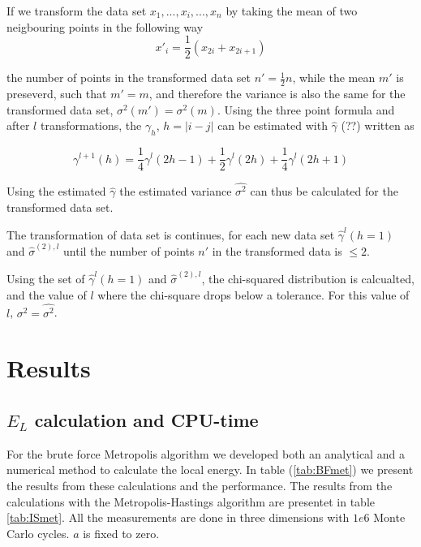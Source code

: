 \documentclass[norsk,a4paper,12pt]{article}
\begin{document}
If we transform the data set ${x_1, ...,x_i,..., x_n}$ by taking the mean of two neigbouring points in the following way
\begin{equation}
	x'_i = \frac{1}{2}(x_{2i} + x_{2i+1})
\end{equation}

 the number of points in the transformed data set $n' = \frac{1}{2} n$, while the mean $m'$ is preseverd, such that $m' = m$, and therefore the variance is also the same for the transformed data set, $\sigma^2(m') = \sigma^2(m)$. Using the three point formula and after $l$ transformations, the $\gamma_h$, $h= |i-j|$ can be estimated with $\hat{\gamma}$ (??) written as 
 
 \begin{equation}
 	\gamma^{l+1}(h) = \frac{1}{4} \gamma^{l}(2h-1) + \frac{1}{2}\gamma^{l}(2h) + \frac{1}{4} \gamma^{l}(2h+1) 
 \end{equation}

Using the estimated  $\hat{\gamma}$ the estimated variance $ \hat{\sigma^2}$ can thus be calculated for the transformed data set.

 The transformation of data set  is continues, for each new data set $\hat{\gamma}^l(h=1)$ and $\hat{\sigma}^{(2),l}$ until the number of points $n'$ in the transformed data is $\leq 2$. 
 
 Using the set of $\hat{\gamma}^l(h=1)$ and $\hat{\sigma}^{(2),l}$, the chi-squared distribution is calcualted, and the value of $l$ where the chi-square drops below a tolerance. For this value of $l$, $\sigma^2 = \hat{\sigma^2}$.


\section{Results} \label{Results}

\subsection{$E_L$ calculation and CPU-time}\label{CPU}
For the brute force Metropolis algorithm we developed both an analytical and a numerical method to calculate the local energy. In table (\ref{tab:BFmet}) we present the results from these calculations and the performance. The results from the calculations with the Metropolis-Hastings algorithm are presentet in table \ref{tab:ISmet}. All the measurements are done in three dimensions with $1e6$ Monte Carlo cycles. $a$ is fixed to zero.
\end{document}
